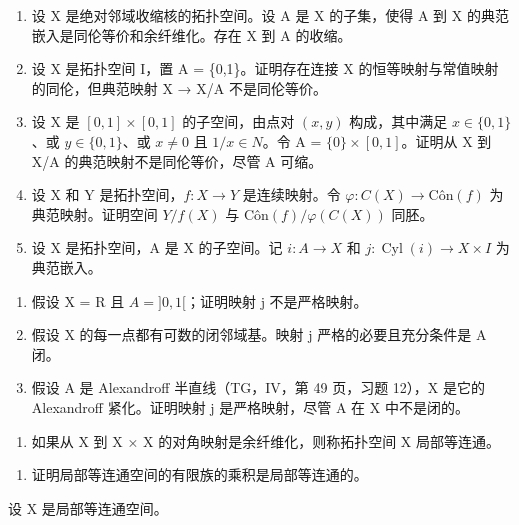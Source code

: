 \begin{enumerate}
\def\labelenumi{\arabic{enumi})}
\setcounter{enumi}{12}
\item
  设 X 是绝对邻域收缩核的拓扑空间。设 A 是 X 的子集，使得 A 到 X 的典范嵌入是同伦等价和余纤维化。存在 X 到 A 的收缩。
\item
  设 X 是拓扑空间 I，置 A = \{0,1\}。证明存在连接 X 的恒等映射与常值映射的同伦，但典范映射 X → X/A 不是同伦等价。
\item
  设 X 是 \([0,1]\times[0,1]\) 的子空间，由点对 \((x,y)\) 构成，其中满足 \(x\in\{0,1\}\)、或 \(y\in\{0,1\}\)、或 \(x\neq0\) 且 \(1/x\in N\)。令 A = \(\{0\}\times[0,1]\)。证明从 X 到 X/A 的典范映射不是同伦等价，尽管 A 可缩。
\item
  设 X 和 Y 是拓扑空间，\(f: X \to Y\) 是连续映射。令 \(\varphi: C(X) \to \text{Côn}(f)\) 为典范映射。证明空间 \(Y/f(X)\) 与 \(\text{Côn}(f)/\varphi(C(X))\) 同胚。
\item
  设 X 是拓扑空间，A 是 X 的子空间。记 \(i\colon A \to X\) 和 \(j\colon \operatorname{Cyl}(i) \to X \times I\) 为典范嵌入。
\end{enumerate}

\begin{enumerate}
\def\labelenumi{\alph{enumi})}
\item
  假设 X = R 且 \(A = ]0, 1[\)；证明映射 j 不是严格映射。
\item
  假设 X 的每一点都有可数的闭邻域基。映射 j 严格的必要且充分条件是 A 闭。
\item
  假设 A 是 Alexandroff 半直线（TG，IV，第 49 页，习题 12），X 是它的 Alexandroff 紧化。证明映射 j 是严格映射，尽管 A 在 X 中不是闭的。
\end{enumerate}

\begin{enumerate}
\def\labelenumi{\arabic{enumi})}
\setcounter{enumi}{17}
\tightlist
\item
如果从 X 到 X × X 的对角映射是余纤维化，则称拓扑空间 X 局部等连通。
\end{enumerate}

\begin{enumerate}
\def\labelenumi{\alph{enumi})}
\tightlist
\item
  证明局部等连通空间的有限族的乘积是局部等连通的。
\end{enumerate}

设 X 是局部等连通空间。

